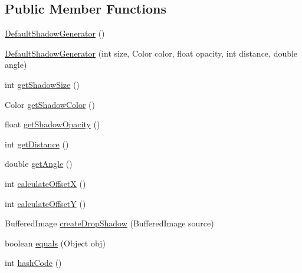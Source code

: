 \subsection*{Public Member Functions}
\begin{DoxyCompactItemize}
\item 
\mbox{\hyperlink{classorg_1_1jfree_1_1chart_1_1util_1_1_default_shadow_generator_ae056aa58d30bed7754d9d83adca1d339}{Default\+Shadow\+Generator}} ()
\item 
\mbox{\hyperlink{classorg_1_1jfree_1_1chart_1_1util_1_1_default_shadow_generator_afc9c55b470e09befc07a014b09b03985}{Default\+Shadow\+Generator}} (int size, Color color, float opacity, int distance, double angle)
\item 
int \mbox{\hyperlink{classorg_1_1jfree_1_1chart_1_1util_1_1_default_shadow_generator_ab093070f3892fe9d9eee9adc57dcbf63}{get\+Shadow\+Size}} ()
\item 
Color \mbox{\hyperlink{classorg_1_1jfree_1_1chart_1_1util_1_1_default_shadow_generator_a0f8d61be38f76035ee649f8c5fd3b15b}{get\+Shadow\+Color}} ()
\item 
float \mbox{\hyperlink{classorg_1_1jfree_1_1chart_1_1util_1_1_default_shadow_generator_a531af67f6299b20168607704d232a7c6}{get\+Shadow\+Opacity}} ()
\item 
int \mbox{\hyperlink{classorg_1_1jfree_1_1chart_1_1util_1_1_default_shadow_generator_a64119a8f4b708396b09a4522e875ad0e}{get\+Distance}} ()
\item 
double \mbox{\hyperlink{classorg_1_1jfree_1_1chart_1_1util_1_1_default_shadow_generator_ac75c433ac75290b40b9882f888e64934}{get\+Angle}} ()
\item 
int \mbox{\hyperlink{classorg_1_1jfree_1_1chart_1_1util_1_1_default_shadow_generator_a30826c0062e4caa01d58438d4fd05733}{calculate\+OffsetX}} ()
\item 
int \mbox{\hyperlink{classorg_1_1jfree_1_1chart_1_1util_1_1_default_shadow_generator_ae526cdf627474b32814f887b140609cf}{calculate\+OffsetY}} ()
\item 
Buffered\+Image \mbox{\hyperlink{classorg_1_1jfree_1_1chart_1_1util_1_1_default_shadow_generator_a5ecdea4578e1625dc9b059108c6c82b6}{create\+Drop\+Shadow}} (Buffered\+Image source)
\item 
boolean \mbox{\hyperlink{classorg_1_1jfree_1_1chart_1_1util_1_1_default_shadow_generator_a6ee7c3198a4ddaa9d6b3533353555222}{equals}} (Object obj)
\item 
int \mbox{\hyperlink{classorg_1_1jfree_1_1chart_1_1util_1_1_default_shadow_generator_ac7f5cef9916ef70f18dfcd8ca1eeef27}{hash\+Code}} ()
\end{DoxyCompactItemize}
